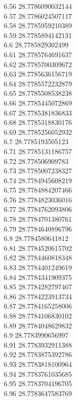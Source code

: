 {6.56	28.7786090032144\\
6.57	28.7786024507117\\
6.58	28.7785959210389\\
6.59	28.7785894142131\\
6.6	28.7785829302499\\
6.61	28.7785764691637\\
6.62	28.7785700309672\\
6.63	28.7785636156719\\
6.64	28.7785572232879\\
6.65	28.7785508538238\\
6.66	28.7785445072869\\
6.67	28.7785381836833\\
6.68	28.7785318830176\\
6.69	28.7785256052932\\
6.7	28.7785193505123\\
6.71	28.7785131186757\\
6.72	28.778506909783\\
6.73	28.7785007238327\\
6.74	28.7784945608219\\
6.75	28.7784884207466\\
6.76	28.7784823036016\\
6.77	28.7784762093806\\
6.78	28.7784701380761\\
6.79	28.7784640896796\\
6.8	28.7784580641812\\
6.81	28.7784520615702\\
6.82	28.7784460818348\\
6.83	28.7784401249619\\
6.84	28.7784341909375\\
6.85	28.7784282797467\\
6.86	28.7784223913734\\
6.87	28.7784165258006\\
6.88	28.7784106830102\\
6.89	28.7784048629832\\
6.9	28.7783990656997\\
6.91	28.7783932911388\\
6.92	28.7783875392786\\
6.93	28.7783818100964\\
6.94	28.7783761035685\\
6.95	28.7783704196705\\
6.96	28.7783647583769\\
}
